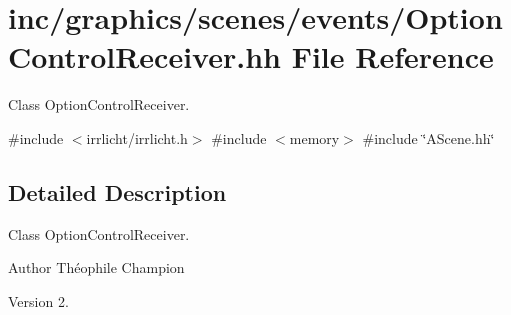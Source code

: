 \hypertarget{OptionControlReceiver_8hh}{}\section{inc/graphics/scenes/events/\+Option\+Control\+Receiver.hh File Reference}
\label{OptionControlReceiver_8hh}


Class Option\+Control\+Receiver.  


{\ttfamily \#include $<$irrlicht/irrlicht.\+h$>$}\newline
{\ttfamily \#include $<$memory$>$}\newline
{\ttfamily \#include \char`\"{}A\+Scene.\+hh\char`\"{}}\newline


\subsection{Detailed Description}
Class Option\+Control\+Receiver. 

\begin{DoxyAuthor}{Author}
Théophile Champion 
\end{DoxyAuthor}
\begin{DoxyVersion}{Version}
2. 
\end{DoxyVersion}
